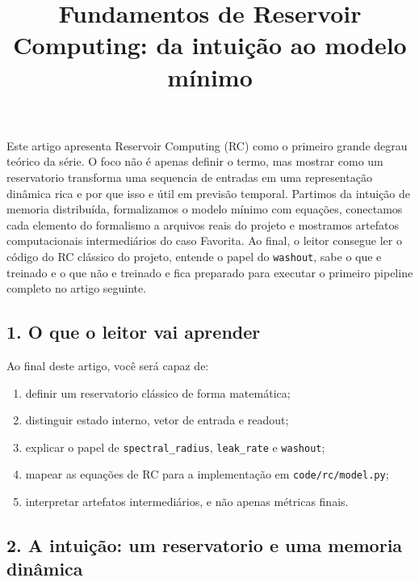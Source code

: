 \documentclass[12pt]{article}
\title{Fundamentos de Reservoir Computing: da intuição ao modelo mínimo}
\author{}
\providecommand{\tightlist}{%
          \setlength{\itemsep}{0pt}\setlength{\parskip}{0pt}}
\begin{document}
        \maketitle

        \begin{resumo}
        Este artigo apresenta Reservoir Computing (RC) como o primeiro grande degrau teórico da série. O foco não é apenas definir o termo, mas mostrar como um reservatorio transforma uma sequencia de entradas em uma representação dinâmica rica e por que isso e útil em previsão temporal. Partimos da intuição de memoria distribuída, formalizamos o modelo mínimo com equações, conectamos cada elemento do formalismo a arquivos reais do projeto e mostramos artefatos computacionais intermediários do caso Favorita. Ao final, o leitor consegue ler o código do RC clássico do projeto, entende o papel do \texttt{washout}, sabe o que e treinado e o que não e treinado e fica preparado para executar o primeiro pipeline completo no artigo seguinte.
        \end{resumo}

        \subsection{1. O que o leitor vai aprender}\label{1-o-que-o-leitor-vai-aprender}

Ao final deste artigo, você será capaz de:

\begin{enumerate}
\def\labelenumi{\arabic{enumi}.}
\tightlist
\item
  definir um reservatorio clássico de forma matemática;
\item
  distinguir estado interno, vetor de entrada e readout;
\item
  explicar o papel de \texttt{spectral\_radius}, \texttt{leak\_rate} e \texttt{washout};
\item
  mapear as equações de RC para a implementação em \texttt{code/rc/model.py};
\item
  interpretar artefatos intermediários, e não apenas métricas finais.
\end{enumerate}

\subsection{2. A intuição: um reservatorio e uma memoria dinâmica}\label{2-a-intuiuxe7uxe3o-um-reservatorio-e-uma-memoria-dinuxe2mica}
\end{document}
